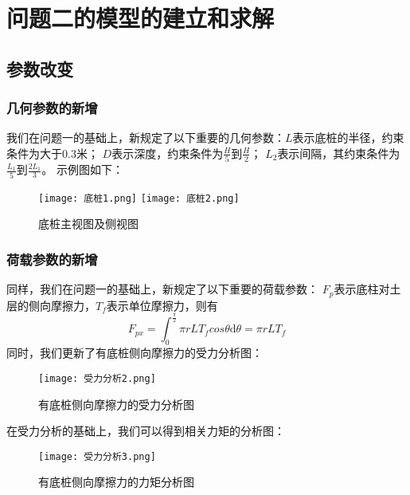 \documentclass[withoutpreface,bwprint]{cumcmthesis}
\begin{document}

\section{问题二的模型的建立和求解}
\subsection{参数改变}
\subsubsection{几何参数的新增}
我们在问题一的基础上，新规定了以下重要的几何参数：$L$表示底桩的半径，约束条件为大于0.3米；
$D$表示深度，约束条件为$\frac{H}{5}$到$\frac{H}{2}$；
$L_2$表示间隔，其约束条件为$\frac{L_1}{5}$到$\frac{2L_1}{3}$。
示例图如下：

\begin{figure}[H]
\centering
{}
{\texttt{[image: 底桩1.png]}}
{\texttt{[image: 底桩2.png]}}
\caption{底桩主视图及侧视图}\label{fig:底桩主视图及侧视图}
\end{figure} 

\subsubsection{荷载参数的新增}
同样，我们在问题一的基础上，新规定了以下重要的荷载参数：
$F_p$表示底柱对土层的侧向摩擦力，$T_f$表示单位摩擦力，则有
    \begin{equation}
        F_{px}=\int_{0}^{\frac{\pi }{2} }\pi rLT_fcos\theta  \mathrm{d}\theta=\pi rLT_f
    \end{equation}
同时，我们更新了有底桩侧向摩擦力的受力分析图：

    \begin{figure}[H]
        \centering
        \texttt{[image: 受力分析2.png]}
        \caption{有底桩侧向摩擦力的受力分析图}
        \label{fig:有底桩侧向摩擦力的受力分析图}
    \end{figure}

在受力分析的基础上，我们可以得到相关力矩的分析图：
    \begin{figure}[H]
    \centering
    \texttt{[image: 受力分析3.png]}
    \caption{有底桩侧向摩擦力的力矩分析图}
    \label{fig:有底桩侧向摩擦力的力矩分析图}
    \end{figure}
\end{document}
